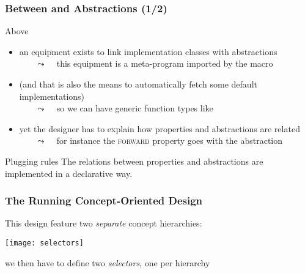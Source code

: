 \begin{frame}
  \frametitle{Between \bftop and Abstractions (1/2)}

Above \bftop
\medskip

\begin{itemize}
  \scriptsize
\item an equipment exists to link implementation classes with abstractions\\
    ~~~ {\tiny $\leadsto$ ~ this equipment is a meta-program imported by the macro {\color{mediumblue}{stc\_equip\_namespace}}}
  \smallskip
\item (and that is also the means to automatically fetch some default implementations)\\
  ~~~ {\tiny $\leadsto$ ~ so we can have generic function types like \bfreverseT}
  \smallskip
\item yet the designer has to explain how properties and abstractions are related\\
  ~~~ {\tiny $\leadsto$ ~ for instance the \textsc{forward} property goes with the \bfForwardIterator abstraction }
\end{itemize}

\medskip

  \begin{block}{Plugging rules}
    The relations between properties and abstractions are implemented
    in a declarative way.
  \end{block}

\end{frame}



\begin{frame}
  \frametitle{The Running Concept-Oriented Design}

{\scriptsize This design feature two \textit{separate} concept hierarchies:}

\medskip

\texttt{[image: selectors]}

\medskip

{\scriptsize we then have to define two \textit{selectors}, one per hierarchy}

\end{frame}



